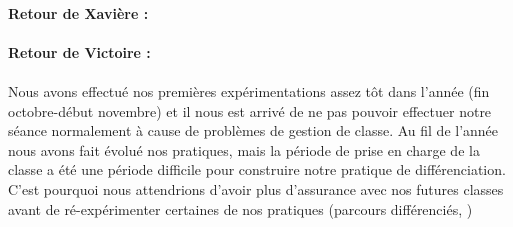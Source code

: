 \paragraph*{Retour de Xavière :}

\paragraph*{Retour de Victoire :}

\paragraph*{}
Nous avons effectué nos premières expérimentations assez tôt dans l'année (fin octobre-début novembre) et il nous est arrivé de ne pas pouvoir effectuer notre séance normalement à cause de problèmes de gestion de classe. Au fil de l'année nous avons fait évolué nos pratiques, mais la période de prise en charge de la classe a été une période difficile pour construire notre pratique de différenciation. C'est pourquoi nous  attendrions d'avoir plus d'assurance  avec nos futures classes avant de ré-expérimenter certaines de nos pratiques (parcours différenciés, )

